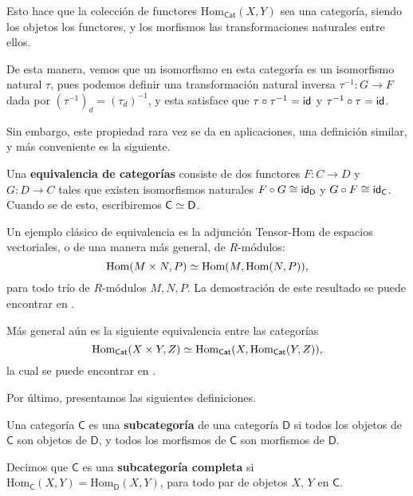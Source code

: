 \documentclass[../main.tex]{subfiles}
\begin{document}
Esto hace que la colecci\'on de functores $\text{Hom}_{\mathsf{Cat}}(X, Y)$ sea una categor\'ia, siendo los objetos los functores, y los morfismos las transformaciones naturales entre ellos.

De esta manera, vemos que un isomorfismo en esta categor\'ia es un isomorfismo natural $\tau$, pues podemos definir una transformaci\'on natural inversa $\tau^{-1}:G \to F$ dada por $(\tau^{-1})_d=(\tau_d)^{-1}$, y esta satisface que $\tau \circ \tau^{-1}=\idfunc$ y $\tau^{-1}\circ \tau=\idfunc$.

Sin embargo, este propiedad rara vez se da en aplicaciones, una definici\'on similar, y m\'as conveniente es la siguiente.

\begin{definitionap}
    Una \textbf{equivalencia de categor\'ias} consiste de dos functores $F:C \to D$ y $G:D \to C$ tales que existen isomorfismos naturales $F \circ G \cong \idfunc[\mathsf{D}]$ y $G \circ F \cong \idfunc[\mathsf{C}]$. Cuando se de esto, escribiremos $\eqv{\mathsf{C}}{\mathsf{D}}$.
\end{definitionap}

\begin{exampleap}\label{tensor-hom}
    Un ejemplo cl\'asico de equivalencia es la adjunci\'on Tensor-Hom de espacios vectoriales, o de una manera m\'as general, de $R$-m\'odulos:
    \[ \eqv{\text{Hom}(M \times N, P)}{\text{Hom}(M, \text{Hom}(N,P))}, \]
    para todo tr\'io de $R$-m\'odulos $M,N,P$. La demostración de este resultado se puede encontrar en \cite{aluffi_algebra_2009}.

    M\'as general a\'un es la siguiente equivalencia entre las categor\'ias
    \[ \eqv{\text{Hom}_{\mathsf{Cat}}(X \times Y, Z)}{\text{Hom}_{\mathsf{Cat}}(X, \text{Hom}_{\mathsf{Cat}}(Y,Z))}, \]
    la cual se puede encontrar en \cite{mac_lane_categories_2010}.
\end{exampleap}

Por \'ultimo, presentamos las siguientes definiciones.

\begin{definitionap}
    Una categor\'ia $\mathsf{C}$ es una \textbf{subcategor\'ia} de una categor\'ia $\mathsf{D}$ si todos los objetos de $\mathsf{C}$ son objetos de $\mathsf{D}$, y todos los morfismos de $\mathsf{C}$ son morfismos de $\mathsf{D}$.

    Decimos que $\mathsf{C}$ es una \textbf{subcategor\'ia completa} si $\text{Hom}_\mathsf{C}(X,Y)=\text{Hom}_\mathsf{D}(X,Y)$, para todo par de objetos $X$, $Y$ en $\mathsf{C}$.
\end{definitionap}
\end{document}
